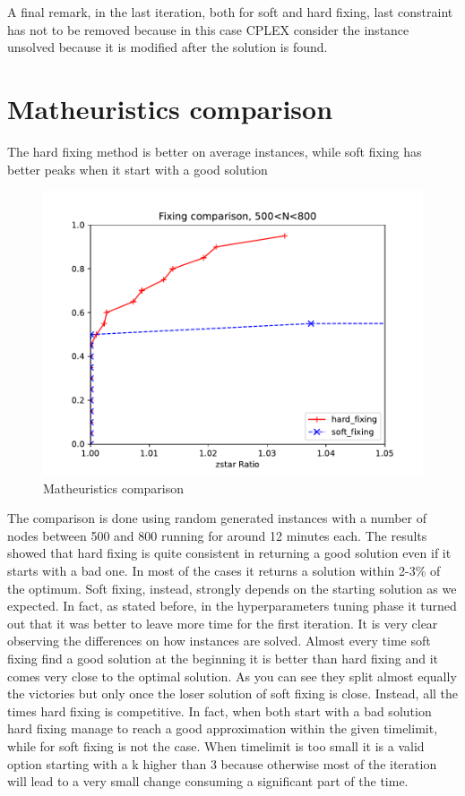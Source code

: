 A final remark, in the last iteration, both for soft and hard fixing, last
constraint has not to be removed because in this case CPLEX consider the
instance unsolved because it is modified after the solution is found.

\section{Matheuristics comparison}

\begin{claim}
    The hard fixing method is better on average instances, while soft fixing has better peaks when it start with a good solution
\end{claim}

\begin{figure}[h]
    \centering
        \includegraphics[width=0.8\linewidth]{figures/math}
        \caption{Matheuristics comparison}
\end{figure}

The comparison is done using random generated instances with a number of nodes
between 500 and 800 running for around 12 minutes each. The results showed that
hard fixing is quite consistent in returning a good solution even if it starts
with a bad one. In most of the cases it returns a solution within 2-3\% of the
optimum. Soft fixing, instead, strongly depends on the starting solution as we
expected. In fact, as stated before, in the hyperparameters tuning phase it
turned out that it was better to leave more time for the first iteration. It is
very clear observing the differences on how instances are solved. Almost every
time soft fixing find a good solution at the beginning it is better than hard
fixing and it comes very close to the optimal solution. As you can see they
split almost equally the victories but only once the loser solution of soft
fixing is close. Instead, all the times hard fixing is competitive. In fact,
when both start with a bad solution hard fixing manage to reach a good
approximation within the given timelimit, while for soft fixing is not the
case. When timelimit is too small it is a valid option starting with a k higher
than 3 because otherwise most of the iteration will lead to a very small change
consuming a significant part of the time.     
